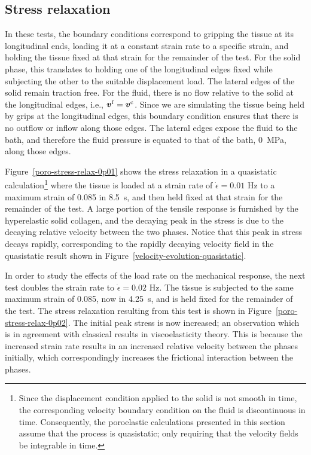 \subsection{Stress relaxation}
\label{stress-relaxation}

In these tests, the boundary conditions correspond to gripping the
tissue at its longitudinal ends, loading it at a constant strain rate
to a specific strain, and holding the tissue fixed at that strain for
the remainder of the test. For the solid phase, this translates to
holding one of the longitudinal edges fixed while subjecting the other
to the suitable displacement load. The lateral edges of the solid
remain traction free. For the fluid, there is no flow relative to the
solid at the longitudinal edges, i.e., $\mbox{\boldmath$ v$}^{\mathrm{f}} =
\mbox{\boldmath$ v$}^{\mathrm{c}}$. Since we are simulating the tissue being held by
grips at the longitudinal edges, this boundary condition ensures that
there is no outflow or inflow along those edges. The lateral edges
expose the fluid to the bath, and therefore the fluid pressure is
equated to that of the bath, 0~MPa, along those edges.

Figure~\ref{poro-stress-relax-0p01} shows the stress relaxation in a
quasistatic calculation\footnote{Since the displacement condition
  applied to the solid is not smooth in time, the corresponding
  velocity boundary condition on the fluid is discontinuous in
  time. Consequently, the poroelastic calculations presented in this
  section assume that the process is quasistatic; only requiring that
  the velocity fields be integrable in time.}  where the tissue is
loaded at a strain rate of $\dot{\epsilon}=0.01$ Hz to a maximum
strain of 0.085 in 8.5~s, and then held fixed at that strain for the
remainder of the test. A large portion of the tensile response is
furnished by the hyperelastic solid collagen, and the decaying peak in
the stress is due to the decaying relative velocity between the two
phases. Notice that this peak in stress decays rapidly, corresponding
to the rapidly decaying velocity field in the quasistatic result shown
in Figure~\ref{velocity-evolution-quasistatic}.

In order to study the effects of the load rate on the mechanical
response, the next test doubles the strain rate to $\dot{\epsilon} =
0.02$ Hz. The tissue is subjected to the same maximum strain of 0.085,
now in 4.25~s, and is held fixed for the remainder of the test. The
stress relaxation resulting from this test is shown in
Figure~\ref{poro-stress-relax-0p02}. The initial peak stress is now
increased; an observation which is in agreement with classical results
in viscoelasticity theory. This is because the increased strain rate
results in an increased relative velocity between the phases
initially, which correspondingly increases the frictional interaction
between the phases.

